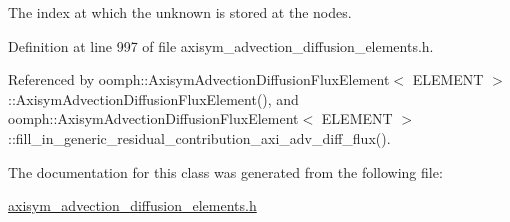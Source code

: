 The index at which the unknown is stored at the nodes. 



Definition at line 997 of file axisym\+\_\+advection\+\_\+diffusion\+\_\+elements.\+h.



Referenced by oomph\+::\+Axisym\+Advection\+Diffusion\+Flux\+Element$<$ E\+L\+E\+M\+E\+N\+T $>$\+::\+Axisym\+Advection\+Diffusion\+Flux\+Element(), and oomph\+::\+Axisym\+Advection\+Diffusion\+Flux\+Element$<$ E\+L\+E\+M\+E\+N\+T $>$\+::fill\+\_\+in\+\_\+generic\+\_\+residual\+\_\+contribution\+\_\+axi\+\_\+adv\+\_\+diff\+\_\+flux().



The documentation for this class was generated from the following file\+:\begin{DoxyCompactItemize}
\item 
\hyperlink{axisym__advection__diffusion__elements_8h}{axisym\+\_\+advection\+\_\+diffusion\+\_\+elements.\+h}\end{DoxyCompactItemize}
